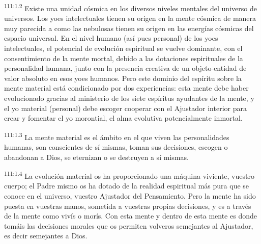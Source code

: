 \par
\textsuperscript{111:1.2} Existe una unidad cósmica en los diversos niveles mentales del universo de universos. Los yoes intelectuales tienen su origen en la mente cósmica de manera muy parecida a como las nebulosas tienen su origen en las energías cósmicas del espacio universal. En el nivel humano (así pues personal) de los yoes intelectuales, el potencial de evolución espiritual se vuelve dominante, con el consentimiento de la mente mortal, debido a las dotaciones espirituales de la personalidad humana, junto con la presencia creativa de un objeto-entidad de valor absoluto en esos yoes humanos. Pero este dominio del espíritu sobre la mente material está condicionado por dos experiencias: esta mente debe haber evolucionado gracias al ministerio de los siete espíritus ayudantes de la mente, y el yo material (personal) debe escoger cooperar con el Ajustador interior para crear y fomentar el yo morontial, el alma evolutiva potencialmente inmortal.

\par
\textsuperscript{111:1.3} La mente material es el ámbito en el que viven las personalidades humanas, son conscientes de sí mismas, toman sus decisiones, escogen o abandonan a Dios, se eternizan o se destruyen a sí mismas.

\par
\textsuperscript{111:1.4} La evolución material os ha proporcionado una máquina viviente, vuestro cuerpo; el Padre mismo os ha dotado de la realidad espiritual más pura que se conoce en el universo, vuestro Ajustador del Pensamiento. Pero la mente ha sido puesta en vuestras manos, sometida a vuestras propias decisiones, y es a través de la mente como vivís o morís. Con esta mente y dentro de esta mente es donde tomáis las decisiones morales que os permiten volveros semejantes al Ajustador, es decir semejantes a Dios.


